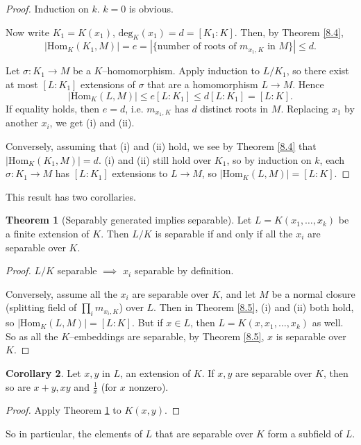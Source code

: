 \documentclass{article}
\theoremstyle{definition}
\newtheorem{theorem}{Theorem}[section]
\newtheorem{cor}[theorem]{Corollary}
\begin{document}
\begin{proof}
    Induction on $k$. $k=0$ is obvious.

    Now write $K_1=K(x_1)$, $\text{deg}_{K}(x_1) = d = [K_1 : K]$. Then, by Theorem \ref{8.4}, $$|\text{Hom}_K(K_1,M)| = e = |\{\text{number of roots of }m_{x_1,K} \text{ in } M\}| \le d.$$

    Let $\sigma : K_1 \to M$ be a $K$--homomorphism. Apply induction to $L/K_1$, so there exist at most $[L : K_1]$ extensions of $\sigma$ that are a homomorphism $L \to M$. Hence
    \[
    |\text{Hom}_K(L,M)| \le e [L:K_1] \le d[L:K_1] = [L:K].
    \]
    If equality holds, then $e=d$, i.e. $m_{x_1,K}$ has $d$ distinct roots in $M$. Replacing $x_1$ by another $x_i$, we get (i) and (ii).
    \vspace{1mm}

    Conversely, assuming that (i) and (ii) hold, we see by Theorem \ref{8.4} that $|\text{Hom}_K(K_1,M)|=d$. (i) and (ii) still hold over $K_1$, so by induction on $k$, each $\sigma : K_1 \to M$ has $[L:K_1]$ extensions to $L \to M$, so $|\text{Hom}_K(L,M)|=[L:K]$.
\end{proof}
This result has two corollaries.
\begin{theorem}[Separably generated implies separable]\label{8.6}
    Let $L=K(x_1,\ldots,x_k)$ be a finite extension of $K$. Then $L/K$ is separable if and only if all the $x_i$ are separable over $K$.
\end{theorem}
\begin{proof}
    $L/K$ separable $\implies $ $x_i$ separable by definition.
    \vspace{1mm}

    Conversely, assume all the $x_i$ are separable over $K$, and let $M$ be a normal closure (splitting field of $\prod_{i}^{} m_{x_i,K}$) over $L$. Then in Theorem \ref{8.5}, (i) and (ii) both hold, so $|\text{Hom}_K(L,M)|=[L:K]$. But if $x \in L$, then $L = K(x,x_1,\ldots,x_k)$ as well. So as all the $K$--embeddings are separable, by Theorem \ref{8.5}, $x$ is separable over $K$.
\end{proof}
\begin{cor}
    Let $x,y$ in $L$, an extension of $K$. If $x,y$ are separable over $K$, then so are $x+y,xy$ and $\frac{1}{x}$ (for $x$ nonzero).
\end{cor}
\begin{proof}
    Apply Theorem \ref{8.6} to $K(x,y)$.
\end{proof}
So in particular, the elements of $L$ that are separable over $K$ form a subfield of $L$.
\end{document}
